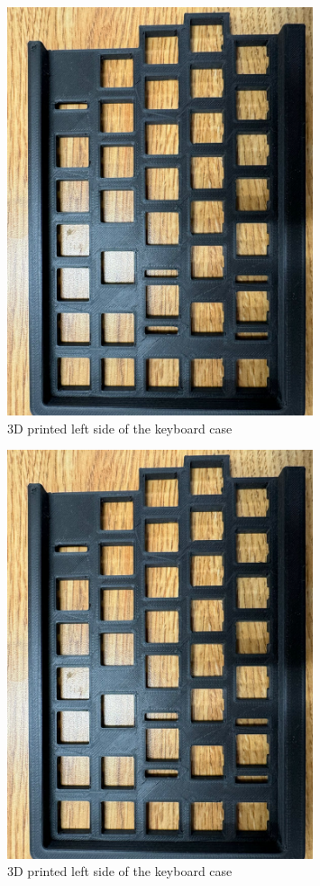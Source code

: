 \documentclass[a4paper,11pt]{article}%
\begin{document}
\begin{figure}[H]
    \centering
    \includegraphics[width=0.8\textwidth]{figures/Update_4/3d1}
    \caption{3D printed left side of the keyboard case}
\end{figure}

\begin{figure}[H]
    \centering
    \includegraphics[width=0.8\textwidth]{figures/Update_4/3d1}
    \caption{3D printed left side of the keyboard case}
\end{figure}
\end{document}
